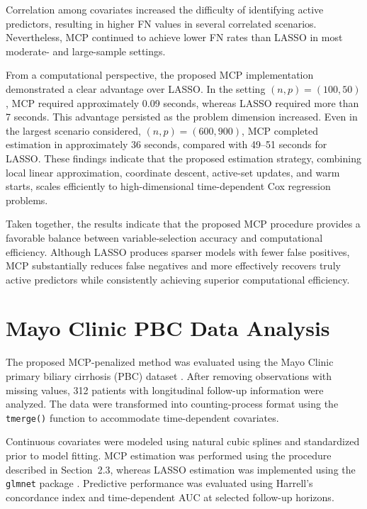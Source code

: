\documentclass[twoside]{article}
\begin{document}
Correlation among covariates increased the difficulty of identifying active predictors, resulting in higher FN values in several correlated scenarios. Nevertheless, MCP continued to achieve lower FN rates than LASSO in most moderate- and large-sample settings.

From a computational perspective, the proposed MCP implementation demonstrated a clear advantage over LASSO. In the setting $(n,p)=(100,50)$, MCP required approximately 0.09 seconds, whereas LASSO required more than 7 seconds. This advantage persisted as the problem dimension increased. Even in the largest scenario considered, $(n,p)=(600,900)$, MCP completed estimation in approximately 36 seconds, compared with 49--51 seconds for LASSO. These findings indicate that the proposed estimation strategy, combining local linear approximation, coordinate descent, active-set updates, and warm starts, scales efficiently to high-dimensional time-dependent Cox regression problems.

Taken together, the results indicate that the proposed MCP procedure provides a favorable balance between variable-selection accuracy and computational efficiency. Although LASSO produces sparser models with fewer false positives, MCP substantially reduces false negatives and more effectively recovers truly active predictors while consistently achieving superior computational efficiency.

\section{Mayo Clinic PBC Data Analysis}
\label{sec:realdata}

The proposed MCP-penalized method was evaluated using the Mayo Clinic primary biliary cirrhosis (PBC) dataset \cite{Therneau2015}. After removing observations with missing values, 312 patients with longitudinal follow-up information were analyzed. The data were transformed into counting-process format using the \texttt{tmerge()} function to accommodate time-dependent covariates.

Continuous covariates were modeled using natural cubic splines and standardized prior to model fitting. MCP estimation was performed using the procedure described in Section~2.3, whereas LASSO estimation was implemented using the \texttt{glmnet} package \cite{simon2011regularization}. Predictive performance was evaluated using Harrell's concordance index and time-dependent AUC at selected follow-up horizons.
\end{document}
